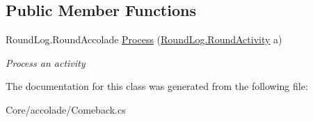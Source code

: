 \subsection*{Public Member Functions}
\begin{DoxyCompactItemize}
\item 
\hypertarget{class_m_b_c_1_1_core_1_1mbc_1_1accolade_1_1_comeback_a805182b1fd3ffde85c1e2cb5c56bc25a}{Round\-Log.\-Round\-Accolade \hyperlink{class_m_b_c_1_1_core_1_1mbc_1_1accolade_1_1_comeback_a805182b1fd3ffde85c1e2cb5c56bc25a}{Process} (\hyperlink{class_m_b_c_1_1_core_1_1_round_log_1_1_round_activity}{Round\-Log.\-Round\-Activity} a)}\label{class_m_b_c_1_1_core_1_1mbc_1_1accolade_1_1_comeback_a805182b1fd3ffde85c1e2cb5c56bc25a}

\begin{DoxyCompactList}\small\item\em Process an activity\end{DoxyCompactList}\end{DoxyCompactItemize}


The documentation for this class was generated from the following file\-:\begin{DoxyCompactItemize}
\item 
Core/accolade/Comeback.\-cs\end{DoxyCompactItemize}
